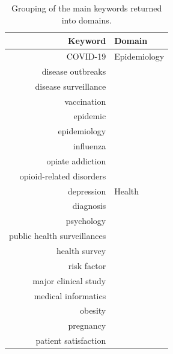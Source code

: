 \begin{center}
    \begin{longtable}{rl}
        \caption{Grouping of the main keywords returned into domains.} \\
        Keyword                         & Domain                       \\
        \toprule
        COVID-19                        & Epidemiology                 \\
        disease outbreaks               &                              \\
        disease surveillance            &                              \\
        vaccination                     &                              \\
        epidemic                        &                              \\
        epidemiology                    &                              \\
        influenza                       &                              \\
        opiate addiction                &                              \\
        opioid-related disorders        &                              \\
        depression                      & Health                       \\
        diagnosis                       &                              \\
        psychology                      &                              \\
        public health surveillances     &                              \\
        health survey                   &                              \\
        risk factor                     &                              \\
        major clinical study            &                              \\
        medical informatics             &                              \\
        obesity                         &                              \\
        pregnancy                       &                              \\
        patient satisfaction            &                              \\

\end{longtable}
\end{center}
